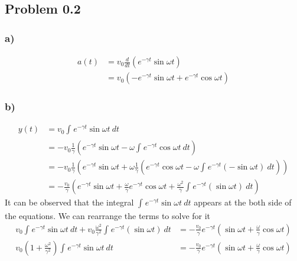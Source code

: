 \documentclass[../homework.tex]{subfiles}
\begin{document}
\subsection{Problem 0.2}
\subsubsection*{a)}
\begin{align*}
    a(t) & = v_0 \frac{d}{dt} \left(e^{-\gamma t} \sin{\omega t}  \right)                   \\
         & = v_0 \left( -e^{-\gamma t}\sin{\omega t} + e^{-\gamma t} \cos{\omega t} \right)
\end{align*}
\subsubsection*{b)}
\begin{align*}
    y(t) & = v_0 \int_{}^{} e^{-\gamma t} \sin{\omega t}~dt                                                                       \\
         & = -v_0 \frac{1}{\gamma} \left(e^{-\gamma t} \sin{\omega t} - \omega \int_{}^{} e^{-\gamma t} \cos{\omega t}~dt \right) \\
         & = -v_0 \frac{1}{\gamma} \left(e^{-\gamma t} \sin{\omega t} + \omega \frac{1}{\gamma} \left(
    e^{-\gamma t} \cos{\omega t} - \omega \int_{}^{} e^{-\gamma t} (-\sin{\omega t})~dt
    \right) \right)                                                                                                               \\
         & = -\frac{v_0}{\gamma} \left(e^{-\gamma t} \sin{\omega t}
    + \frac{\omega}{\gamma} e^{-\gamma t} \cos{\omega t} + \frac{\omega^2}{\gamma} \int_{}^{} e^{-\gamma t} (\sin{\omega t})~dt
    \right)
\end{align*}
It can be observed that the integral $\int_{}^{} e^{-\gamma t} \sin{\omega t}~dt$ appears at the both side of the equations. We can rearrange the terms to solve for it
\begin{align*}
    v_0 \int_{}^{} e^{-\gamma t} \sin{\omega t}~dt + v_0 \frac{\omega^2}{\gamma^2} \int_{}^{} e^{-\gamma t} (\sin{\omega t})~dt & =
    -\frac{v_0}{\gamma} e^{-\gamma t} \left(\sin{\omega t} + \frac{\omega}{\gamma}\cos{\omega t} \right)                            \\
    v_0 \left(1 + \frac{\omega^2}{\gamma^2}\right) \int_{}^{} e^{-\gamma t} \sin{\omega t}~dt                                   & =
    -\frac{v_0}{\gamma} e^{-\gamma t} \left(\sin{\omega t} + \frac{\omega}{\gamma}\cos{\omega t} \right)
\end{align*}
\end{document}
